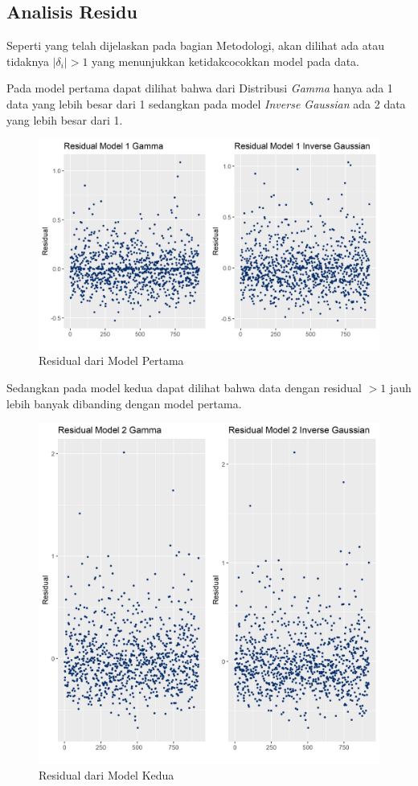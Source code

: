 \documentclass[12pt]{article}
\begin{document}
\subsection{Analisis Residu}  
Seperti yang telah dijelaskan pada bagian Metodologi, akan dilihat ada atau tidaknya $|\delta_i|>1$ yang menunjukkan ketidakcocokkan model pada data. 
\par
Pada model pertama dapat dilihat bahwa  dari Distribusi \textit{Gamma} hanya ada 1 data yang lebih besar dari 1 sedangkan pada model \textit{Inverse Gaussian} ada 2 data yang lebih besar dari 1.
  
\begin{figure}[h!]
    \centering
    \includegraphics[scale = 0.4]{resid1.png}
    \caption{Residual dari Model Pertama}
    \label{fig:resifddd}
\end{figure}    
    
Sedangkan pada model kedua dapat dilihat bahwa data dengan residual $> 1$ jauh lebih banyak dibanding dengan model pertama.  
  
\begin{figure}[h!]
    \centering
    \includegraphics[scale = 0.4]{resid2.png}
    \caption{Residual dari Model Kedua}
    \label{fig:resifddd}
\end{figure}    
\end{document}
